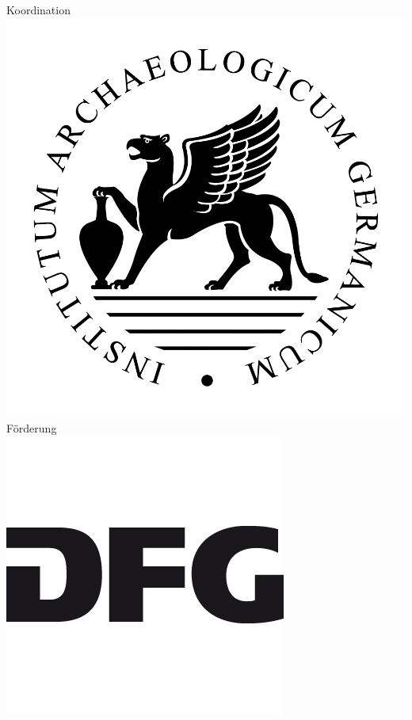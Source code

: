 \begin{titlepage}
\vfill
\begin{flushright} \sffamily
{}
Koordination\\
\includegraphics[width=\textwidth]{deckblattLogos/dai.jpg} 
\endminipage
\hspace{1cm}
Förderung\\
\includegraphics[width=\textwidth]{deckblattLogos/dfg.jpg}
\endminipage

\end{flushright}
\end{titlepage}